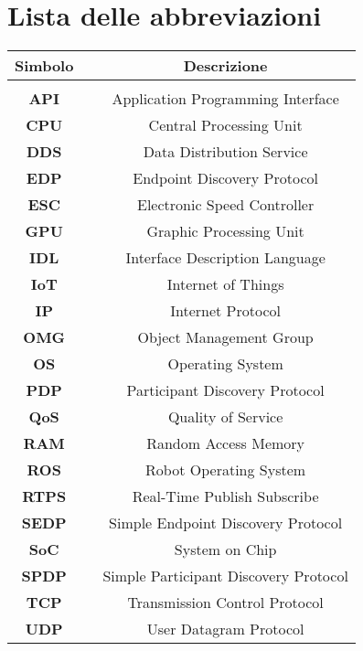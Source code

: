 

\fancyhf{}
\thispagestyle{plain}

\chapter[Lista delle abbreviazioni]{\centering Lista delle abbreviazioni}
\fontsize{14}{14}\selectfont

\begin{center}
\centering
\setlength{\tabcolsep}{15pt}
\fontsize{14}{14}\selectfont
\begin{tabular}{ c c c }
\multicolumn{1}{c}{\Large \textbf{Simbolo}} & & \multicolumn{1}{c}{\Large \textbf{Descrizione}}\\
\hline\hline\\

\textbf{API}  & & Application Programming Interface\\
\textbf{CPU}  & & Central Processing Unit\\
\textbf{DDS}  & & Data Distribution Service\\
\textbf{EDP}  & & Endpoint Discovery Protocol\\
\textbf{ESC}  & & Electronic Speed Controller\\
\textbf{GPU}  & & Graphic Processing Unit\\
\textbf{IDL}  & & Interface Description Language\\
\textbf{IoT}  & & Internet of Things\\
\textbf{IP}   & & Internet Protocol\\
\textbf{OMG}  & & Object Management Group\\
\textbf{OS}   & & Operating System\\
\textbf{PDP}  & & Participant Discovery Protocol\\
\textbf{QoS}  & & Quality of Service\\
\textbf{RAM}  & & Random Access Memory\\
\textbf{ROS}  & & Robot Operating System\\
\textbf{RTPS} & & Real-Time Publish Subscribe\\
\textbf{SEDP} & & Simple Endpoint Discovery Protocol\\
\textbf{SoC}  & & System on Chip\\
\textbf{SPDP} & & Simple Participant Discovery Protocol\\
\textbf{TCP}  & & Transmission Control Protocol\\
\textbf{UDP}  & & User Datagram Protocol\\

\end{tabular}
\end{center}

\restoregeometry

